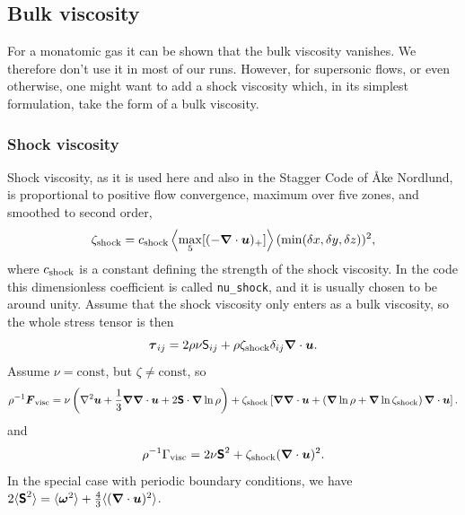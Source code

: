 \documentclass[\mydriver,12pt,twoside,notitlepage,a4paper]{article}
\newcommand{\code}[1]{\texttt{#1}}
\renewcommand{\vec}[1]{\mbox{\boldmath{$#1$}}}
\newcommand{\grad}    {\vec{\nabla}}
\newcommand{\Div}     {\vec{\nabla}\cdot}
\newcommand{\Laplace} {\nabla^2}
\newcommand{\uv}            {\vec{u}}
\newcommand{\omv}           {\boldsymbol{\omega}}
\newcommand{\Strain}        {\boldsymbol{\mathsf{S}}}
\newcommand{\nab}{\mbox{\boldmath $\nabla$} {}}
\begin{document}

\subsection{Bulk viscosity}
\label{Bulkviscosity}

For a monatomic gas it can be shown that the bulk viscosity vanishes.
We therefore don't use it in most of our runs.
However, for supersonic flows, or even otherwise, one might want to add a
shock viscosity which, in its simplest formulation, take the form of a
bulk viscosity.

\subsubsection{Shock viscosity}
\label{ShockViscosity}

Shock viscosity, as it is used here and also in the Stagger Code of {\AA}ke Nordlund,
is proportional to positive flow convergence, maximum over
five zones, and smoothed to second order,
\begin{equation}
\zeta_{\rm shock}=c_{\rm shock}\left<\max_5[(-\Div\uv)_+]\right>(\min(\delta x,\delta y,\delta z))^2,
\end{equation}
where $c_{\rm shock}$ is a constant defining the strength of the shock viscosity.
In the code this dimensionless coefficient is called \code{nu_shock}, and it
is usually chosen to be around unity.
Assume that the shock viscosity only enters as a bulk viscosity,
so the whole stress tensor is then
\begin{equation}
\vec{\tau}_{ij}=2\rho\nu{\sf S}_{ij}+\rho\zeta_{\rm shock}\delta_{ij}\nab\cdot\uv.
\end{equation}
Assume $\nu=\mbox{const}$, but $\zeta\neq\mbox{const}$, so
\begin{equation}
\rho^{-1}\vec{F}_{\rm visc}=
\nu\left(\Laplace\uv+\frac{1}{3}\grad\Div\uv+2\Strain\cdot\grad\ln\rho\right)
+\zeta_{\rm shock}\left[\grad\Div\uv+\left(\grad\ln\rho+\grad\ln\zeta_{\rm shock}\right)\Div\uv\right].
\end{equation}
and
\begin{equation}
\rho^{-1}\Gamma_{\rm visc}=2\nu\Strain^2+\zeta_{\rm shock}(\Div\uv)^2.
\end{equation}
In the special case with periodic boundary conditions, we have
$2\langle\Strain^2\rangle=\langle\omv^2\rangle+{4\over3}\langle(\nab\cdot\uv)^2\rangle$.
\end{document}
